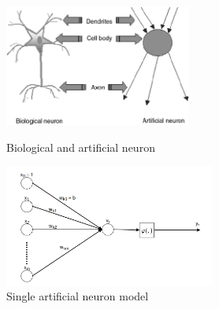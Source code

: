 \begin{figure}[H]
	\centering
	\includegraphics[height=4cm]{images/Fig-1-Analogy-between-artificial-neuron-and-biological-neuron.png}
	\caption{Biological and artificial neuron \cite{analogyneurons}}
	\label{fig:artifical_and_biological}
	\endminipage\hfill
	\includegraphics[height=4cm]{images/artificial_neuron.png}
	\caption{Single artificial neuron model}
	\label{fig:artificial_neuron}
	\endminipage
\end{figure}

